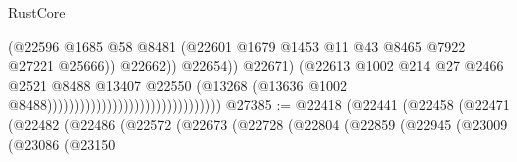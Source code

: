 \begin{lexlean}{RustCore}
\begin{coremodule}
                                                                        (@22596
                                                                          @1685
                                                                          @58
                                                                          @8481
                                                                          (@22601
                                                                            @1679
                                                                            @1453
                                                                            @11
                                                                            @43
                                                                            @8465
                                                                            @7922
                                                                            @27221
                                                                            @25666))
                                                                        @22662))
                                                                    @22654))
                                                                @22671)
                                                              (@22613
                                                                @1002
                                                                @214
                                                                @27
                                                                @2466
                                                                @2521
                                                                @8488
                                                                @13407
                                                                @22550
                                                                (@13268
                                                                  (@13636
                                                                    @1002
                                                                    @8488))))))))))))))))))))))))))))))))
@27385 := @22418
    (@22441
      (@22458
        (@22471
          (@22482
            (@22486
              (@22572
                (@22673
                  (@22728
                    (@22804
                      (@22859
                        (@22945
                          (@23009
                            (@23086
                              (@23150

\end{coremodule}
\end{lexlean}
